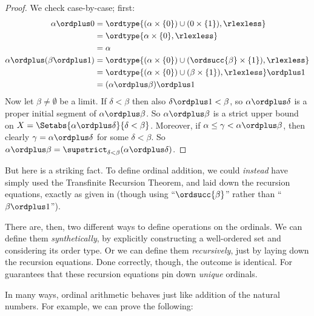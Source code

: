 \documentclass[../../../include/open-logic-section]{subfiles}
\begin{document}
\begin{proof}
We check case-by-case; first:
\begin{align*}
	\alpha \ordplus  0 
	& = \ordtype{(\alpha \times \{0\}) \cup (0 \times \{1\}), \rlexless} \\
	&= \ordtype{\alpha \times \{0\}, \rlexless}\\
	&= \alpha\\
	\alpha \ordplus (\beta \ordplus  1) 
	&= \ordtype{(\alpha\times \{0\}) \cup (\ordsucc{\beta}\times \{1\}), \rlexless} \\
	&= \ordtype{(\alpha\times \{0\}) \cup (\beta \times \{1\}), \rlexless} \ordplus 1\\
	&= (\alpha \ordplus  \beta) \ordplus  1
\end{align*}
Now let $\beta \neq \emptyset$ be a limit. If $\delta < \beta$ then
also $\delta\ordplus 1 < \beta$, so $\alpha \ordplus  \delta$ is a
proper initial segment of $\alpha \ordplus  \beta$. So $\alpha
\ordplus  \beta$ is a strict upper bound on $X = \Setabs{\alpha
\ordplus  \delta}{\delta < \beta}$. Moreover, if $\alpha \leq \gamma <
\alpha \ordplus  \beta$, then clearly $\gamma = \alpha \ordplus
\delta$ for some $\delta < \beta$. So $\alpha \ordplus  \beta =
\supstrict_{\delta< \beta}(\alpha\ordplus \delta)$.
\end{proof}

But here is a striking fact. To define ordinal addition, we could
\emph{instead} have simply used the Transfinite Recursion Theorem, and
laid down the recursion equations, exactly as given in
 (though using ``$\ordsucc{\beta}$''
rather than ``$\beta \ordplus 1$'').

There are, then, two different ways to define operations on the
ordinals. We can define them \emph{synthetically}, by explicitly
constructing a well-ordered set and considering its order type. Or we
can define them \emph{recursively}, just by laying down the recursion
equations. Done correctly, though, the outcome is identical. For
 guarantees
that these recursion equations pin down \emph{unique} ordinals.

In many ways, ordinal arithmetic behaves just like addition of the
natural numbers. For example, we can prove the following:
\end{document}
